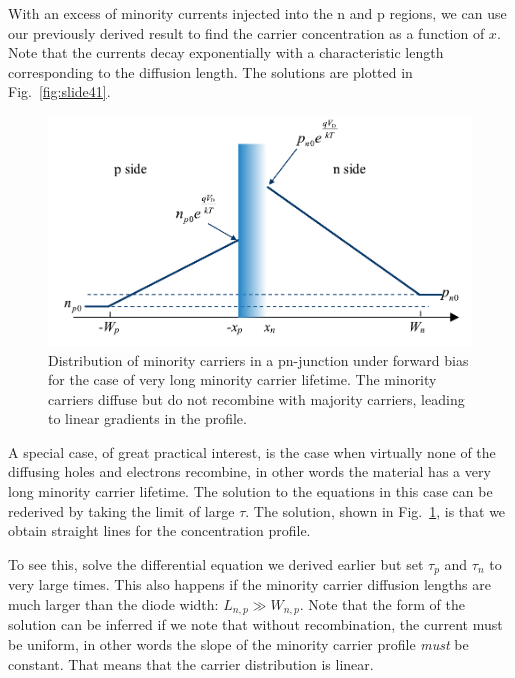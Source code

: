 With an excess of minority currents injected into the n and p regions, we can use our previously derived result to find the carrier concentration as a function of $x$.  Note that the currents decay exponentially with a characteristic length corresponding to the diffusion length.  The solutions are plotted in Fig.~\ref{fig:slide41}.
\begin{figure}[tb]
\begin{center}
\includegraphics[width=.75\columnwidth]{slide42}
\end{center}
\caption{Distribution of minority carriers in a pn-junction under forward bias for the case of very long minority carrier lifetime.  The minority carriers diffuse but do not recombine with majority carriers, leading to linear gradients in the profile. }
\label{fig:slide42}
\end{figure}

A special case, of great practical interest, is the case when virtually none of the diffusing holes and electrons recombine, in other words the material has a very long minority carrier lifetime.  The solution to the equations in this case can be rederived by taking the limit of large $\tau$.  The solution, shown in Fig.~\ref{fig:slide42}, is that we obtain straight lines for the concentration profile.

To see this, solve the differential equation we derived earlier but set $\tau_p$ and $\tau_n$ to very large times.  This also happens if the minority carrier diffusion lengths are much larger than the diode width: $ {L_{n,p}} \gg {W_{n,p}} $.  Note that the form of the solution can be inferred if we note that without recombination, the current must be uniform, in other words the slope of the minority carrier profile \emph{must} be constant. That means that the carrier distribution is linear.
